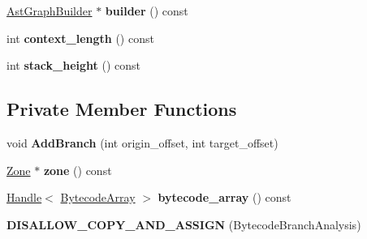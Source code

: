 \begin{DoxyCompactItemize}
\item 
\hyperlink{classv8_1_1internal_1_1compiler_1_1_ast_graph_builder}{Ast\+Graph\+Builder} $\ast$ {\bfseries builder} () const \hypertarget{classv8_1_1internal_1_1compiler_1_1_b_a_s_e___e_m_b_e_d_d_e_d_a06723fe1f54b64aa164b3a66d6fea680}{}\label{classv8_1_1internal_1_1compiler_1_1_b_a_s_e___e_m_b_e_d_d_e_d_a06723fe1f54b64aa164b3a66d6fea680}

\item 
int {\bfseries context\+\_\+length} () const \hypertarget{classv8_1_1internal_1_1compiler_1_1_b_a_s_e___e_m_b_e_d_d_e_d_a7a8ef17bf56c72b2d05f011240ef243c}{}\label{classv8_1_1internal_1_1compiler_1_1_b_a_s_e___e_m_b_e_d_d_e_d_a7a8ef17bf56c72b2d05f011240ef243c}

\item 
int {\bfseries stack\+\_\+height} () const \hypertarget{classv8_1_1internal_1_1compiler_1_1_b_a_s_e___e_m_b_e_d_d_e_d_aa3c7061176205cca1198df4465d58db3}{}\label{classv8_1_1internal_1_1compiler_1_1_b_a_s_e___e_m_b_e_d_d_e_d_aa3c7061176205cca1198df4465d58db3}

\end{DoxyCompactItemize}
\subsection*{Private Member Functions}
\begin{DoxyCompactItemize}
\item 
void {\bfseries Add\+Branch} (int origin\+\_\+offset, int target\+\_\+offset)\hypertarget{classv8_1_1internal_1_1compiler_1_1_b_a_s_e___e_m_b_e_d_d_e_d_a1b5cbb9ca7974c89ca0d070694d08c06}{}\label{classv8_1_1internal_1_1compiler_1_1_b_a_s_e___e_m_b_e_d_d_e_d_a1b5cbb9ca7974c89ca0d070694d08c06}

\item 
\hyperlink{classv8_1_1internal_1_1_zone}{Zone} $\ast$ {\bfseries zone} () const \hypertarget{classv8_1_1internal_1_1compiler_1_1_b_a_s_e___e_m_b_e_d_d_e_d_a868abfb3a4cc840281253b573f99e133}{}\label{classv8_1_1internal_1_1compiler_1_1_b_a_s_e___e_m_b_e_d_d_e_d_a868abfb3a4cc840281253b573f99e133}

\item 
\hyperlink{classv8_1_1internal_1_1_handle}{Handle}$<$ \hyperlink{classv8_1_1internal_1_1_bytecode_array}{Bytecode\+Array} $>$ {\bfseries bytecode\+\_\+array} () const \hypertarget{classv8_1_1internal_1_1compiler_1_1_b_a_s_e___e_m_b_e_d_d_e_d_a10fbc636fcd91442022711f04ce520ae}{}\label{classv8_1_1internal_1_1compiler_1_1_b_a_s_e___e_m_b_e_d_d_e_d_a10fbc636fcd91442022711f04ce520ae}

\item 
{\bfseries D\+I\+S\+A\+L\+L\+O\+W\+\_\+\+C\+O\+P\+Y\+\_\+\+A\+N\+D\+\_\+\+A\+S\+S\+I\+GN} (Bytecode\+Branch\+Analysis)\hypertarget{classv8_1_1internal_1_1compiler_1_1_b_a_s_e___e_m_b_e_d_d_e_d_af49b583808aadbda2a051c5457b41f9c}{}\label{classv8_1_1internal_1_1compiler_1_1_b_a_s_e___e_m_b_e_d_d_e_d_af49b583808aadbda2a051c5457b41f9c}

\end{DoxyCompactItemize}
